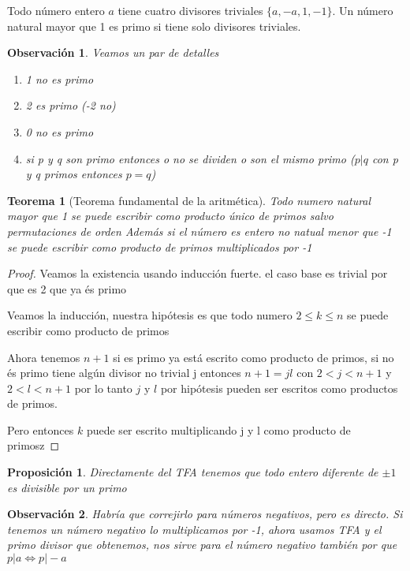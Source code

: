 \documentclass{article}
\theoremstyle{break}
\newtheorem{theorem}{Teorema}[section]
\newtheorem{proposition}{Proposición}
\newtheorem*{remark}{Observación}
\begin{document}
    Todo número entero $a$ tiene cuatro divisores triviales $\{a,-a,1,-1\}$.    
    Un número natural mayor que 1 es primo si tiene solo divisores triviales.

    \begin{remark} Veamos un par de detalles

        \begin{enumerate}
            \item 1 no es primo
            \item 2 es primo (-2 no)
            \item 0 no es primo
            \item si p y q son primo entonces o no se dividen o son el mismo primo ($p|q$ con p y q primos entonces $p=q$)  
        \end{enumerate}
    \end{remark}

    \begin{theorem}[Teorema fundamental de la aritmética]
        Todo numero natural mayor que 1 se puede escribir como producto único de primos salvo permutaciones de orden
        Además si el número es entero no natual menor que -1 se puede escribir como producto de primos multiplicados por -1
    \end{theorem}
    \begin{proof}
        Veamos la existencia usando inducción fuerte. el caso base es trivial por que es 2 que ya és primo

        Veamos la inducción, nuestra hipótesis es que todo numero $2\leq k \leq n$ se puede escribir como producto de primos

        Ahora tenemos $n+1$ si es primo ya está escrito como producto de primos, si no és primo tiene algún divisor no trivial j
        entonces $n+1=jl$ con $2<j<n+1 $ y $2<l<n+1$ por lo tanto $j$ y $l$ por hipótesis pueden ser escritos como productos de primos.

        Pero entonces $k$ puede ser escrito multiplicando j y l como producto de primosz


    \end{proof}

    \begin{proposition}
        Directamente del TFA tenemos que todo entero diferente de $\pm 1$ es divisible por un primo
    \end{proposition}
    \begin{remark}
        Habría que correjirlo para números negativos, pero es directo. Si tenemos un número negativo lo
        multiplicamos por -1, ahora usamos TFA y el primo divisor que obtenemos, nos sirve para el número
        negativo también por que $p|a \iff p|-a$
    \end{remark}
\end{document}
